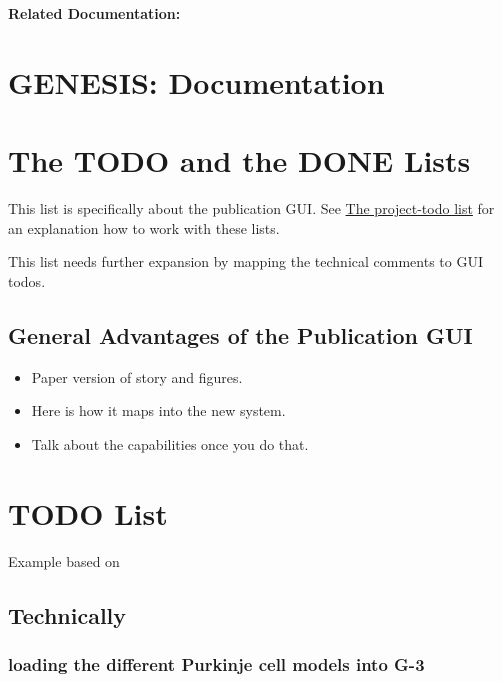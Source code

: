 \documentclass[12pt]{article}
\begin{document}
{\bf Related Documentation:}

\section*{GENESIS: Documentation}

\section{The TODO and the DONE Lists}

This list is specifically about the publication GUI.  See
\href{../project-todo/project-todo.tex}{The project-todo list} for an
explanation how to work with these lists.

This list needs further expansion by mapping the technical comments to
GUI todos.

\subsection{General Advantages of the Publication GUI}
\begin{itemize}
\item Paper version of story and figures.
\item Here is how it maps into the new system.
\item Talk about the capabilities once you do that.
\end{itemize}


\section{TODO List}

Example based on
\cite{deschutter94:_purkin_i}\cite{deschutter94:_purkin_ii}\cite{schutter94:_simul_purkin}

\subsection{Technically}

\subsubsection{loading the different Purkinje cell models into G-3}
\end{document}
